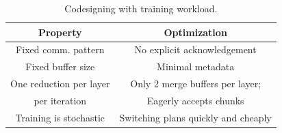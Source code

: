 





\begin{table}[t]
	\centering
    \footnotesize
	\begin{tabular}{|c|c|}
		\hline 
		Property & \ha Optimization \\
		\hline
		Fixed comm. pattern & No explicit acknowledgement \\
		\hline
		Fixed buffer size & Minimal metadata \\
		\hline
		One reduction per layer & Only 2 merge buffers per layer; \\
		       per iteration    & Eagerly accepts chunks \\
		\hline
		Training is stochastic & Switching plans quickly and cheaply \\ 
		\hline
		
	\end{tabular}
	\caption{Codesigning \ha with training workload.}
	\label{table:codesign2lha}
\end{table}

